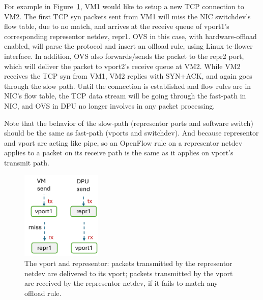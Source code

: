 \documentclass[letterpaper]{article}
\begin{document}
For example in Figure~\ref{fig:arch}, VM1 would like to setup a new TCP
connection to VM2. The first TCP syn packets sent from VM1 will miss the
NIC switchdev's flow table, due to no match, and arrives at the receive
queue of vport1's corresponding representor netdev, repr1.
OVS in this case, with hardware-offload enabled, will parse the protocol
and insert an offload rule, using Linux tc-flower interface.
In addition, OVS also forwards/sends the packet to the repr2 port, which
will deliver the packet to vport2's receive queue at VM2.
While VM2 receives the TCP syn from VM1, VM2 replies with SYN+ACK, and
again goes through the slow path. Until the connection is established
and flow rules are in NIC's flow table, the TCP data stream will be
going through the fast-path in NIC, and OVS in DPU no longer involves
in any packet processing.

Note that the behavior of the slow-path (representor ports and software
switch) should be the same as fast-path (vports and switchdev).
And because representor and vport are acting like pipe, so an OpenFlow
rule on a representor netdev applies to a packet on its
receive path is the same as it applies on vport's transmit path.
\begin{figure}[h]
\includegraphics[width=1.5in]{pipe.pdf}
\centering
\caption{The vport and representor: packets transmitted by the representor 
netdev are delivered to its vport; packets transmitted by the vport are
received by the representor netdev, if it fails to match any offload rule.}
\label{fig:arch}
\end{figure}

\end{document}
